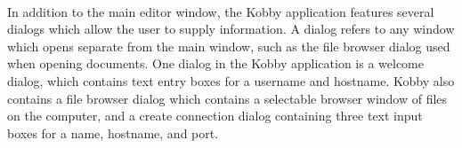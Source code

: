 \documentclass[11pt]{article}
\begin{document}
\paragraph{}In addition to the main editor window, the Kobby application features several dialogs which allow the user to supply information.  A dialog refers to any window which opens separate from the main window, such as the file browser dialog used when opening documents.  One dialog in the Kobby application is a welcome dialog, which contains text entry boxes for a username and hostname.  Kobby also contains a file browser dialog which contains a selectable browser window of files on the computer, and a create connection dialog containing three text input boxes for a name, hostname, and port.
\end{document}
